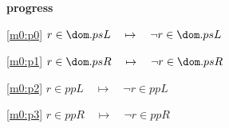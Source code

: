 \textbf{progress}
\begin{block}
\item[ \eqref{m0:p0} ]{$r \in \dom.psL  \quad \mapsto\quad \neg r \in \dom.psL $} %
\item[ \eqref{m0:p1} ]{$r \in \dom.psR  \quad \mapsto\quad \neg r \in \dom.psR $} %
\item[ \eqref{m0:p2} ]{$r \in ppL  \quad \mapsto\quad \neg r \in ppL $} %
\item[ \eqref{m0:p3} ]{$r \in ppR  \quad \mapsto\quad \neg r \in ppR $} %
\end{block}
